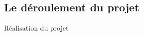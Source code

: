 \documentclass[12pt]{beamer}
\begin{document}
\subsection{Le déroulement du projet}

\begin{frame}{Réalisation du projet}
\end{frame}


\begin{frame}
\end{frame}
\begin{frame}
\end{frame}
\end{document}
